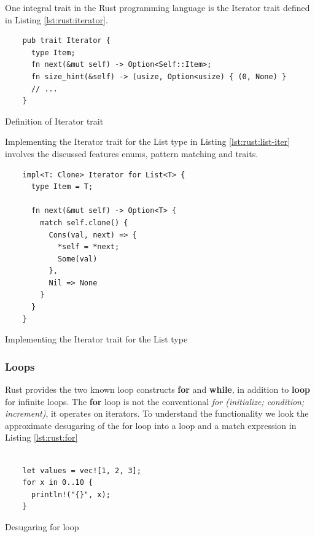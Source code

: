 One integral trait in the Rust programming language is the Iterator trait defined in Listing \ref{lst:rust:iterator}.

\begin{listing}[H]
  \begin{verbatim}
    pub trait Iterator {
      type Item;
      fn next(&mut self) -> Option<Self::Item>;
      fn size_hint(&self) -> (usize, Option<usize) { (0, None) }
      // ...
    }
  \end{verbatim}
  \caption{Definition of Iterator trait}
  \label{lst:rust:iterator}
\end{listing}

Implementing the Iterator trait for the List type in Listing \ref{lst:rust:list-iter} involves the discussed features enums, pattern matching and traits.

\begin{listing}[H]
  \begin{verbatim}
    impl<T: Clone> Iterator for List<T> {
      type Item = T;

      fn next(&mut self) -> Option<T> {
        match self.clone() {
          Cons(val, next) => {
            *self = *next;
            Some(val)
          },
          Nil => None
        }
      }
    }
  \end{verbatim}
  \caption{Implementing the Iterator trait for the List type}
  \label{lst:rust:list-iter}
\end{listing}


\subsubsection{Loops}

Rust provides the two known loop constructs \textbf{for} and \textbf{while}, in addition to \textbf{loop} for infinite loops.
The \textbf{for} loop is not the conventional \textit{for (initialize; condition; increment)}, it operates on iterators.
To understand the functionality we look the approximate desugaring of the for loop into a loop and a match expression in Listing \ref{lst:rust:for}


\begin{minipage}[b]{0.5\linewidth}
  \begin{listing}[H]
  \begin{verbatim}

    let values = vec![1, 2, 3];
    for x in 0..10 {
      println!("{}", x);
    }

  \end{verbatim}
  \caption{Desugaring for loop}
  \label{lst:rust:for}
  \end{listing}
  \end{minipage}

